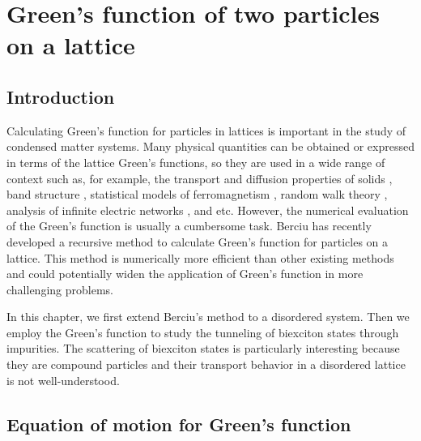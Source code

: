 \chapter{Green's function of two particles on a lattice}
\label{ch:greenfunc}

\section{Introduction}
\label{sec:introGreenFunc}

Calculating Green's function for particles in lattices is  important in the study of condensed matter systems. Many physical
quantities can be obtained or expressed in terms of the lattice Green's functions, so they are used in a wide range of
context such as, for example, the transport and diffusion properties of solids \cite{economou2006}, band structure 
\cite{koster1954}, statistical models 
of ferromagnetism \cite{mccoy1978, dalton1967, lax1952}, random walk theory \cite{montroll1965},  analysis of 
infinite electric networks \cite{cserti2000, cserti2002, asad2004, asad2005}, and etc. 
However, the numerical evaluation of the Green's function is usually a cumbersome task\cite{Berciu2010}. 
Berciu has recently developed a recursive method \cite{Berciu2010, Berciu2011, Berciu2012} to calculate Green's function for particles on a lattice. 
This
method is numerically more efficient than other existing methods and could potentially widen the application of 
Green's function in more challenging problems. 

In this chapter, we first extend Berciu's method to a disordered system. Then we employ the Green's 
function to study the tunneling of biexciton states through impurities. The scattering of biexciton states is particularly
interesting because they are compound particles and their transport behavior in a disordered lattice
is not well-understood\cite{bulatov2005}.

\section{Equation of motion for Green's function}
\label{sec:equationOfMotion}

